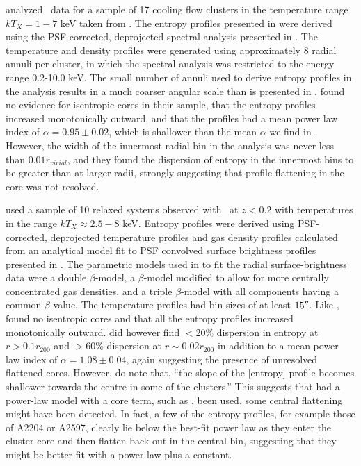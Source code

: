 \documentclass[12pt,preprint]{aastex}
\begin{document}
\citet{piffaretti05} analyzed \xmm\ data for a sample of 17 cooling
flow clusters in the temperature range $kT_X = 1-7$ keV taken from
\citet{2004A&A...413..415K}. The entropy profiles presented in
\citet{piffaretti05} were derived using the PSF-corrected, deprojected
spectral analysis presented in \citet{2004A&A...413..415K}. The
temperature and density profiles were generated using approximately 8
radial annuli per cluster, in which the spectral analysis was
restricted to the energy range 0.2-10.0 keV. The small number of
annuli used to derive entropy profiles in the \citet{piffaretti05}
analysis results in a much coarser angular scale than is presented in
\accept. \citet{piffaretti05} found no evidence for isentropic cores
in their sample, that the entropy profiles increased monotonically
outward, and that the profiles had a mean power law index of $\alpha =
0.95 \pm 0.02$, which is shallower than the mean $\alpha$ we find in
\accept. However, the width of the innermost radial bin in the
\citet{piffaretti05} analysis was never less than $0.01 r_{virial}$,
and they found the dispersion of entropy in the innermost bins to be
greater than at larger radii, strongly suggesting that profile
flattening in the core was not resolved.

\citet{pratt06} used a sample of 10 relaxed systems observed with
\xmm\ at $z < 0.2$ with temperatures in the range $kT_X \approx 2.5-8$
keV. Entropy profiles were derived using PSF-corrected, deprojected
temperature profiles and gas density profiles calculated from an
analytical model fit to PSF convolved surface brightness profiles
presented in \citet{2005A&A...435....1P}. The parametric models used
in \citet{2005A&A...435....1P} to fit the radial surface-brightness
data were a double $\beta$-model, a $\beta$-model modified to allow
for more centrally concentrated gas densities, and a triple
$\beta$-model with all components having a common $\beta$ value. The
temperature profiles had bin sizes of at least $15\mathrm{^\prime}\hskip -0.1em\mathrm{^\prime}$. Like
\citet{piffaretti05}, \citet{pratt06} found no isentropic cores and
that all the entropy profiles increased monotonically
outward. \citet{pratt06} did however find $< 20\%$ dispersion in
entropy at $r > 0.1r_{200}$ and $> 60\%$ dispersion at $r \sim
0.02r_{200}$ in addition to a mean power law index of $\alpha = 1.08
\pm 0.04$, again suggesting the presence of unresolved flattened
cores. However, \citet{pratt06} do note that, ``the slope of the
[entropy] profile becomes shallower towards the centre in some of the
clusters.'' This suggests that had a power-law model with a core term,
such as \kna, been used, some central flattening might have been
detected. In fact, a few of the \citet{pratt06} entropy profiles, for
example those of A2204 or A2597, clearly lie below the best-fit power
law as they enter the cluster core and then flatten back out in the
central bin, suggesting that they might be better fit with a power-law
plus a constant.
\end{document}
